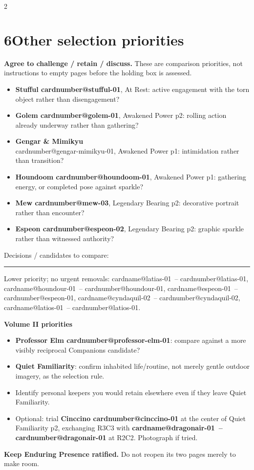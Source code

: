 \documentclass[10pt,a4paper]{article}
\makeatletter
\newcommand{\sub}[1]{\par\vspace{3pt}\textbf{#1}\par}
\newcommand{\id}[1]{\csname cardnumber@#1\endcsname}
\newcommand{\card}[1]{\csname cardname@#1\endcsname\ -- \id{#1}}
\newcommand{\blank}{\rule{\linewidth}{0.25pt}}
\newcommand{\smallnote}[1]{{\fontsize{8.5}{10}\selectfont #1\par}}
\makeatother
\begin{document}
\begin{multicols}{2}
\section{6\quad Other selection priorities}
\textbf{Agree to challenge / retain / discuss.} These are comparison priorities, not instructions to empty pages before the holding box is assessed.
\begin{itemize}
\item \textbf{Stufful \id{stufful-01}}, At Rest: active engagement with the torn object rather than disengagement?
\item \textbf{Golem \id{golem-01}}, Awakened Power p2: rolling action already underway rather than gathering?
\item \textbf{Gengar \& Mimikyu}\\\id{gengar-mimikyu-01}, Awakened Power p1: intimidation rather than transition?
\item \textbf{Houndoom \id{houndoom-01}}, Awakened Power p1: gathering energy, or completed pose against sparkle?
\item \textbf{Mew \id{mew-03}}, Legendary Bearing p2: decorative portrait rather than encounter?
\item \textbf{Espeon \id{espeon-02}}, Legendary Bearing p2: graphic sparkle rather than witnessed authority?
\end{itemize}
Decisions / candidates to compare: \hrulefill\par\blank

\smallnote{Lower priority; no urgent removals: \card{latias-01}, \card{houndour-01}, \card{espeon-01}, \card{cyndaquil-02}, \card{latios-01}.}

\columnbreak
\sub{Volume II priorities}
\begin{itemize}
\item \textbf{Professor Elm \id{professor-elm-01}}: compare against a more visibly reciprocal Companions candidate?
\item \textbf{Quiet Familiarity}: confirm inhabited life/routine, not merely gentle outdoor imagery, as the selection rule.
\item Identify personal keepers you would retain elsewhere even if they leave Quiet Familiarity.
\item Optional: trial \textbf{Cinccino \id{cinccino-01}} at the center of Quiet Familiarity p2, exchanging R3C3 with \textbf{\card{dragonair-01}} at R2C2. Photograph if tried.
\end{itemize}
\textbf{Keep Enduring Presence ratified.} Do not reopen its two pages merely to make room.


\end{multicols}
\end{document}
